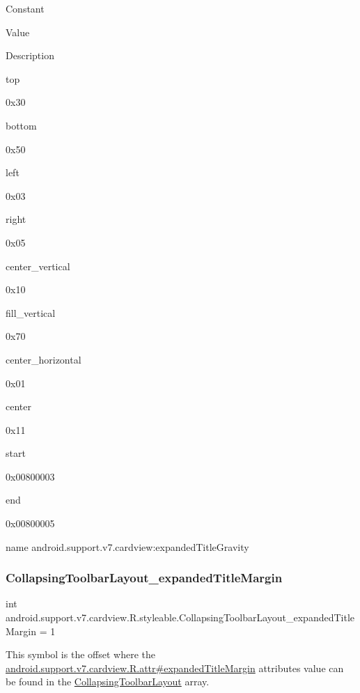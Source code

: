 Constant

Value

Description 

{\ttfamily top}

0x30

{\ttfamily bottom}

0x50

{\ttfamily left}

0x03

{\ttfamily right}

0x05

{\ttfamily center\+\_\+vertical}

0x10

{\ttfamily fill\+\_\+vertical}

0x70

{\ttfamily center\+\_\+horizontal}

0x01

{\ttfamily center}

0x11

{\ttfamily start}

0x00800003

{\ttfamily end}

0x00800005

name android.\+support.\+v7.\+cardview\+:expanded\+Title\+Gravity \mbox{\label{classandroid_1_1support_1_1v7_1_1cardview_1_1R_1_1styleable_af7f7bf893630b5286fdcaec73cb489c5}} 
\subsubsection{\texorpdfstring{Collapsing\+Toolbar\+Layout\+\_\+expanded\+Title\+Margin}{CollapsingToolbarLayout\_expandedTitleMargin}}
{\footnotesize\ttfamily int android.\+support.\+v7.\+cardview.\+R.\+styleable.\+Collapsing\+Toolbar\+Layout\+\_\+expanded\+Title\+Margin = 1\hspace{0.3cm}{\ttfamily [static]}}

This symbol is the offset where the \hyperlink{classandroid_1_1support_1_1v7_1_1cardview_1_1R_1_1attr_aea6ee7452b54b5a08a1365f1d0948dc7}{android.\+support.\+v7.\+cardview.\+R.\+attr\#expanded\+Title\+Margin} attribute\textquotesingle{}s value can be found in the \hyperlink{classandroid_1_1support_1_1v7_1_1cardview_1_1R_1_1styleable_a3b4c5393d0c99cb4e5a7a3911fc606b4}{Collapsing\+Toolbar\+Layout} array.

